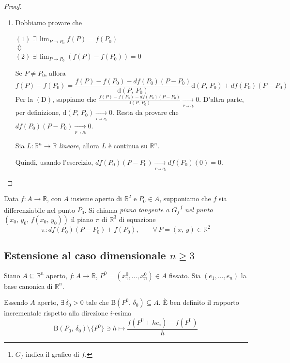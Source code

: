 \begin{proof}
\begin{enumerate}[labelindent=\parindent,leftmargin=*,label=\textnormal{(\roman*)},start=1]
\item
Dobbiamo provare che
	\begin{center}
	$\mathrm{(1)}$
	\hfill
	$\displaystyle \exists \, \lim_{P \rightarrow P_0} f(P) = f(P_0)$\hfill\null\\
	\hfill
	$\Updownarrow$
	\hfill\null\\
	$\mathrm{(2)}$
	\hfill
	$\displaystyle \exists \, \lim_{P \rightarrow P_0} (f(P)-f(P_0)) = 0$\hfill\null
	\end{center}
	Se $P \neq P_0$, allora
	$$
	f(P) - f(P_0) =
	\frac{f(P)-f(P_0)-df(P_0)(P-P_0)}{\mathrm{d}(P,\,P_0)}\mathrm{d}(P,\,P_0)+df(P_0)(P-P_0)
	$$
	Per la $\mathrm{(D)}$, sappiamo che $\frac{f(P)-f(P_0)-df(P_0)(P-P_0)}{\mathrm{d}(P,\,P_0)} \underset{_{P \rightarrow P_0}}{\longrightarrow} 0$. D'altra parte, per definizione, $\mathrm{d}(P,\,P_0) \underset{_{P \rightarrow P_0}}{\longrightarrow} 0$. Resta da provare che $df(P_0)(P-P_0) \underset{_{P \rightarrow P_0}}{\longrightarrow} 0$.
	\begin{exer}
	Sia $L:\mathbb{R}^n \longrightarrow \mathbb{R}$ \emph{lineare}, allora $L$ è continua su $\mathbb{R}^n$.
	\end{exer}
	Quindi, usando l'esercizio, $df(P_0)(P-P_0) \underset{_{P \rightarrow P_0}}{\longrightarrow}  df(P_0)(0) = 0$.
\end{enumerate}
\end{proof}

\begin{definition}
Data $f:A \longrightarrow \mathbb{R}$, con $A$ insieme aperto di $\mathbb{R}^2$ e $P_0 \in A$, supponiamo che $f$ sia differenziabile nel punto $P_0$. Si chiama \emph{piano tangente a $G_f$\footnote{$G_f$ indica il grafico di $f$.} nel punto $(x_0,\,y_0,\,f(x_0,\,y_0))$} il piano $\pi$ di $\mathbb{R}^3$ di equazione
$$\pi : df(P_0)(P-P_0) + f(P_0), \qquad \forall \, P=(x,\,y) \in \mathbb{R}^2$$
\end{definition}

\subsection{Estensione al caso dimensionale $n \geq 3$}
Siano $A \subseteq \mathbb{R}^n$ aperto, $f: A \longrightarrow \mathbb{R}$, $P^0 = (x_1^0,\ldots,x_n^0) \in A$ fissato. Sia $(e_1,\ldots,e_n)$ la base canonica di $\mathbb{R}^n$.

Essendo $A$ aperto, $\exists \, \delta_0 > 0$ tale che $\mathrm{B}(P^0,\,\delta_0) \subseteq A$. \`E ben definito il rapporto incrementale rispetto alla direzione $i$-esima
$$
\mathrm{B}(P_0,\,\delta_0) \setminus \lbrace P^0 \rbrace \ni h \longmapsto
\frac{f(P^0+he_i)-f(P^0)}{h}
$$

